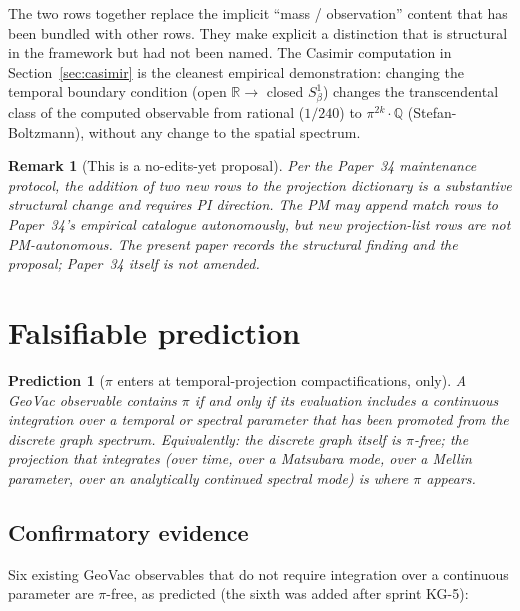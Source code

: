 \documentclass[11pt]{article}
\newtheorem{remark}{Remark}
\newtheorem{prediction}{Prediction}
\begin{document}
The two rows together replace the implicit ``mass / observation''
content that has been bundled with other rows.  They make explicit a
distinction that is structural in the framework but had not been named.
The Casimir computation in Section~\ref{sec:casimir} is the cleanest
empirical demonstration: changing the temporal boundary condition
(open $\mathbb{R} \to$ closed $S^1_\beta$) changes the transcendental
class of the computed observable from rational ($1/240$) to
$\pi^{2k} \cdot \mathbb{Q}$ (Stefan-Boltzmann), without any change to
the spatial spectrum.

\begin{remark}[This is a no-edits-yet proposal]
\label{rem:no_edits}
Per the Paper~34 maintenance protocol, the addition of two new rows to
the projection dictionary is a substantive structural change and
requires PI direction.  The PM may append match rows to Paper~34's
empirical catalogue autonomously, but new projection-list rows are not
PM-autonomous.  The present paper records the structural finding and
the proposal; Paper~34 itself is not amended.
\end{remark}

\section{Falsifiable prediction}
\label{sec:prediction}

\begin{prediction}[$\pi$ enters at temporal-projection compactifications, only]
\label{pred:pi_iff_temporal}
A GeoVac observable contains $\pi$ if and only if its evaluation
includes a continuous integration over a temporal or spectral parameter
that has been promoted from the discrete graph spectrum.  Equivalently:
the discrete graph itself is $\pi$-free; the projection that
\emph{integrates} (over time, over a Matsubara mode, over a Mellin
parameter, over an analytically continued spectral mode) is where $\pi$
appears.
\end{prediction}

\subsection{Confirmatory evidence}

Six existing GeoVac observables that do not require integration over a
continuous parameter are $\pi$-free, as predicted (the sixth was added
after sprint KG-5):
\end{document}
